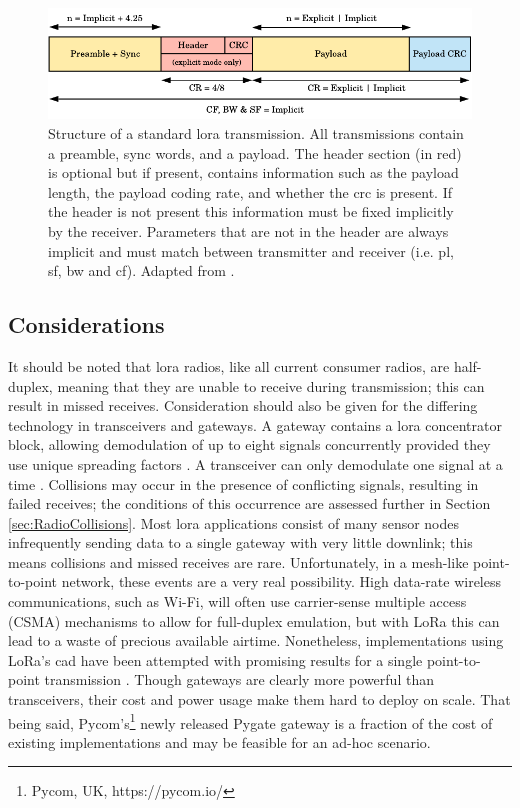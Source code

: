 \begin{figure}[H]
    \centering
   	\includegraphics{Figures/lora_transmission.pdf}
    \caption[\ac{lora} transmission packet structure]{
    Structure of a standard \ac{lora} transmission. All transmissions contain a preamble, sync words, and a payload. The header section (in red) is optional but if present, contains information such as the payload length, the payload coding rate, and whether the \ac{crc} is present. If the header is not present this information must be fixed implicitly by the receiver. Parameters that are not in the header are always implicit and must match between transmitter and receiver (i.e. \ac{pl}, \ac{sf}, \ac{bw} and \ac{cf}). Adapted from \cite{3YP:LORA_SX12}.
    }
    \label{lora_transmission_structure}
\end{figure}

\subsection{Considerations}
It should be noted that \ac{lora} radios, like all current consumer radios, are half-duplex, meaning that they are unable to receive during transmission; this can result in missed receives. Consideration should also be given for the differing technology in transceivers and gateways. A gateway contains a \ac{lora} concentrator block, allowing demodulation of up to eight signals concurrently provided they use unique spreading factors \cite{3YP:LORA_SX1301}. A transceiver can only demodulate one signal at a time \cite{3YP:LORA_SX12}. Collisions may occur in the presence of conflicting signals, resulting in failed receives; the conditions of this occurrence are assessed further in Section \ref{sec:RadioCollisions}. Most \ac{lora} applications consist of many sensor nodes infrequently sending data to a single gateway with very little downlink; this means collisions and missed receives are rare. Unfortunately, in a mesh-like point-to-point network, these events are a very real possibility. High data-rate wireless communications, such as Wi-Fi, will often use carrier-sense multiple access (CSMA) mechanisms to allow for full-duplex emulation, but with LoRa this can lead to a waste of precious available airtime. Nonetheless, implementations using LoRa's \ac{cad} have been attempted with promising results for a single point-to-point transmission \cite{3YP:LORA_CSMA}. Though gateways are clearly more powerful than transceivers, their cost and power usage make them hard to deploy on scale. That being said, Pycom's\footnote{Pycom, UK,  https://pycom.io/} newly released Pygate gateway is a fraction of the cost of existing implementations and may be feasible for an ad-hoc scenario.
